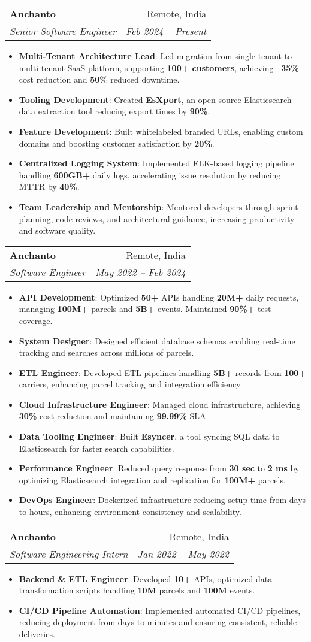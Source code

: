 \documentclass[letterpaper,11pt]{article}
\makeatletter
\newcommand{\resumeItem}[2]{
  \item\small{
    \textbf{#1}{: #2 \vspace{-2pt}}
  }
}
\newcommand{\resumeSubheading}[4]{
  \vspace{-1pt}\item
    \begin{tabular*}{0.97\textwidth}[t]{l@{\extracolsep{\fill}}r}
      \textbf{#1} & #2 \\
      \textit{\small#3} & \textit{\small #4} \\
    \end{tabular*}\vspace{-5pt}
}
\newcommand{\resumeItemListStart}{\begin{itemize}}
\newcommand{\resumeItemListEnd}{\end{itemize}\vspace{-5pt}}
\makeatother
\begin{document}
  \resumeSubheading
    {Anchanto}{Remote, India}
    {Senior Software Engineer}{Feb 2024 -- Present}
      \resumeItemListStart
        \resumeItem{Multi-Tenant Architecture Lead}
          {Led migration from single-tenant to multi-tenant SaaS platform, supporting \textbf{100+ customers}, achieving \textbf{~35\%} cost reduction and \textbf{50\%} reduced downtime.}
        \resumeItem{Tooling Development}
          {Created \textbf{EsXport}, an open-source Elasticsearch data extraction tool reducing export times by \textbf{90\%}.}
        \resumeItem{Feature Development}
          {Built whitelabeled branded URLs, enabling custom domains and boosting customer satisfaction by \textbf{20\%}.}
        \resumeItem{Centralized Logging System}
          {Implemented ELK-based logging pipeline handling \textbf{600GB+} daily logs, accelerating issue resolution by reducing MTTR by \textbf{40\%}.}
        \resumeItem{Team Leadership and Mentorship}
          {Mentored developers through sprint planning, code reviews, and architectural guidance, increasing productivity and software quality.}
      \resumeItemListEnd

    \resumeSubheading
    {Anchanto}{Remote, India}
    {Software Engineer}{May 2022 -- Feb 2024}
      \resumeItemListStart
        \resumeItem{API Development}
          {Optimized \textbf{50+} APIs handling \textbf{20M+} daily requests, managing \textbf{100M+} parcels and \textbf{5B+} events. Maintained \textbf{90\%+} test coverage.}
        \resumeItem{System Designer}
          {Designed efficient database schemas enabling real-time tracking and searches across millions of parcels.}
        \resumeItem{ETL Engineer}
          {Developed ETL pipelines handling \textbf{5B+} records from \textbf{100+} carriers, enhancing parcel tracking and integration efficiency.}
        \resumeItem{Cloud Infrastructure Engineer}
          {Managed cloud infrastructure, achieving \textbf{30\%} cost reduction and maintaining \textbf{99.99\%} SLA.}
        \resumeItem{Data Tooling Engineer}
          {Built \textbf{Esyncer}, a tool syncing SQL data to Elasticsearch for faster search capabilities.}
        \resumeItem{Performance Engineer}
          {Reduced query response from \textbf{30 sec} to \textbf{2 ms} by optimizing Elasticsearch integration and replication for \textbf{100M+} parcels.}
        \resumeItem{DevOps Engineer}
          {Dockerized infrastructure reducing setup time from days to hours, enhancing environment consistency and scalability.}
      \resumeItemListEnd

    \resumeSubheading
    {Anchanto}{Remote, India}
    {Software Engineering Intern}{Jan 2022 -- May 2022}
      \resumeItemListStart
        \resumeItem{Backend \& ETL Engineer}
          {Developed \textbf{10+} APIs, optimized data transformation scripts handling \textbf{10M} parcels and \textbf{100M} events.}
        \resumeItem{CI/CD Pipeline Automation}
          {Implemented automated CI/CD pipelines, reducing deployment from days to minutes and ensuring consistent, reliable deliveries.}
  \resumeItemListEnd
\end{document}
